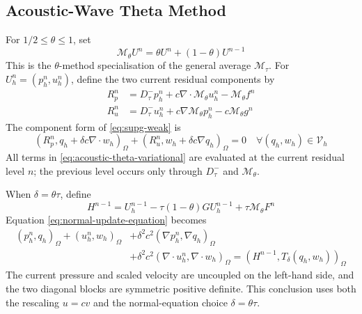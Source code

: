 \documentclass[11pt]{article}
\begin{document}

\subsection{Acoustic-Wave Theta Method}
\label{subsec:acoustic-wave-equation}
For \(1/2\le\theta\le1\), set
\begin{equation}
\mathcal M_{\theta}U^n=\theta U^n+(1-\theta)U^{n-1} \label{eq:theta-average-acoustic}
\end{equation}
This is the \(\theta\)-method specialisation of the general average
\(\mathcal M_{\tau}\).
For \(U_h^n=(p_h^n,u_h^n)\), define the two current residual components by
\begin{align}
R_p^n&=D_{\tau}^{-}p_h^n+c\nabla\cdot\mathcal M_{\theta}u_h^n
-\mathcal M_{\theta}f^n \label{eq:acoustic-pressure-residual}\\
R_u^n&=D_{\tau}^{-}u_h^n+c\nabla\mathcal M_{\theta}p_h^n
-c\mathcal M_{\theta}g^n \label{eq:acoustic-velocity-residual}
\end{align}
The component form of \eqref{eq:supg-weak} is
\begin{equation}
(R_p^n,q_h+\delta c\nabla\cdot w_h)_{\Omega}
+(R_u^n,w_h+\delta c\nabla q_h)_{\Omega}=0
\quad \forall(q_h,w_h)\in\mathcal V_h \label{eq:acoustic-theta-variational}
\end{equation}
All terms in \eqref{eq:acoustic-theta-variational} are evaluated at the
current residual level \(n\); the previous level occurs only through
\(D_{\tau}^{-}\) and \(\mathcal M_{\theta}\).

When \(\delta=\theta\tau\), define
\begin{equation}
H^{n-1}=U_h^{n-1}-\tau(1-\theta)GU_h^{n-1}
+\tau\mathcal M_{\theta}F^n \label{eq:acoustic-theta-history}
\end{equation}
Equation \eqref{eq:normal-update-equation} becomes
\begin{align}
(p_h^n,q_h)_{\Omega}+(u_h^n,w_h)_{\Omega}
&+\delta^2c^2(\nabla p_h^n,\nabla q_h)_{\Omega} \label{eq:acoustic-theta-spd-pressure}\\
&+\delta^2c^2(\nabla\cdot u_h^n,\nabla\cdot w_h)_{\Omega}
=(H^{n-1},T_{\delta}(q_h,w_h))_{\Omega} \label{eq:acoustic-theta-spd-velocity}
\end{align}
The current pressure and scaled velocity are uncoupled on the left-hand side,
and the two diagonal blocks are symmetric positive definite. This conclusion
uses both the rescaling \(u=cv\) and the normal-equation choice
\(\delta=\theta\tau\).
\end{document}
